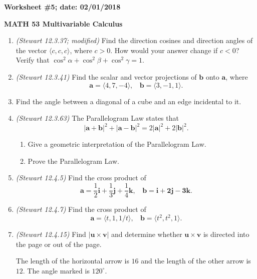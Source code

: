 \documentclass{article}
\begin{document}
{\bf Worksheet \#5; date: 02/01/2018}

{\bf MATH 53 Multivariable Calculus}

\begin{enumerate}
\item {\em (Stewart 12.3.37; modified)} Find the direction cosines and direction angles of the vector $\langle c, c, c \rangle$, where $c > 0$. How would your answer change if $c < 0$? Verify that $\cos^2 \alpha + \cos^2 \beta + \cos^2 \gamma = 1$.

\item {\em (Stewart 12.3.41)} Find the scalar and vector projections of $\mathbf{b}$ onto $\mathbf{a}$, where
\[
\mathbf{a} = \langle 4, 7, -4\rangle, ~~~~ \mathbf{b} = \langle 3, -1, 1\rangle.
\]

\item Find the angle between a diagonal of a cube and an edge incidental to it.

\item {\em (Stewart 12.3.63)} The Parallelogram Law states that
\[
|\mathbf{a} + \mathbf{b}|^2 + |\mathbf{a} - \mathbf{b}|^2 = 2|\mathbf{a}|^2 + 2|\mathbf{b}|^2.
\]
\begin{enumerate}
\item Give a geometric interpretation of the Parallelogram Law.
\item Prove the Parallelogram Law.
\end{enumerate}

\item {\em (Stewart 12.4.5)} Find the cross product of
\[
\mathbf{a} = \frac{1}{2} \mathbf{i} + \frac{1}{3} \mathbf{j} + \frac{1}{4} \mathbf{k}, ~~~~ \mathbf{b} = \mathbf{i} + \mathbf{2j} - \mathbf{3k}.
\]

\item {\em (Stewart 12.4.7)} Find the cross product of
\[
\mathbf{a} = \langle t, 1, 1/t\rangle, ~~~~ \mathbf{b} = \langle t^2, t^2, 1\rangle.
\]

\item {\em (Stewart 12.4.15)} Find $|\mathbf{u} \times \mathbf{v}|$ and determine whether $\mathbf{u} \times \mathbf{v}$ is directed into the page or out of the page.
\begin{center}
\end{center}
The length of the horizontal arrow is $16$ and the length of the other arrow is $12$. The angle marked is $120^\circ$.


\end{enumerate}
\end{document}

